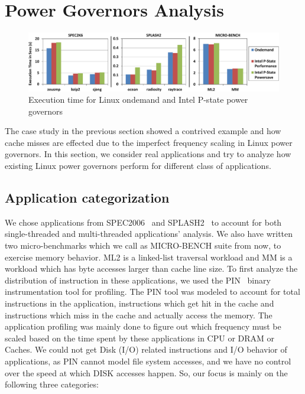 \section{Power Governors Analysis}\label{sec:appl}

\begin{figure}[h]
  \begin{center}
\includegraphics[width=\linewidth]{figs/def-exec-time-crop.pdf}
  \end{center}
  \vspace{-0.1in}
  \caption{Execution time for Linux ondemand and Intel P-state power governors}
  \label{fig:def-perf}
\end{figure}

The case study in the previous section showed a contrived example and how cache misses are effected 
due to the imperfect frequency scaling in Linux power governors.
In this section, we consider real applications and try to analyze how existing Linux power
governors perform for different class of applications.

\subsection{Application categorization}
We chose applications from  SPEC2006~\cite{spec2006} and SPLASH2~\cite{splash2} to account for both single-threaded and 
multi-threaded applications' analysis. 
We also have written two micro-benchmarks which we call as MICRO-BENCH
suite from now, to exercise 
memory behavior. ML2 is a linked-list traversal workload and 
MM is a workload which has byte accesses larger than
cache line size. 
To first analyze the distribution of instruction in these applications,
we used the PIN~\cite{pin} binary instrumentation tool for profiling.
The PIN tool was modeled to account for total instructions in the application, 
instructions which get hit in the cache and instructions which miss in the cache
and actually access the memory. 
The application profiling was mainly done to figure out
which frequency must be scaled  
based on the time spent by these applications
in CPU or DRAM or Caches.
We could not get Disk (I/O) related instructions and I/O behavior
of applications, as PIN cannot model file system accesses, and
we have no control over the speed at which DISK accesses happen. So, our focus is
mainly on the following three categories:

